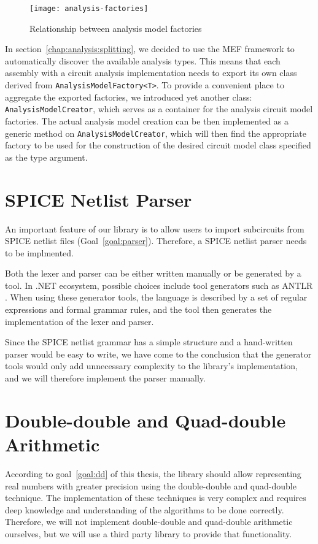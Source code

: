 \begin{figure}[h]
	\centering
	\texttt{[image: analysis-factories]}
	\caption{Relationship between analysis model factories}
	\label{fig:analysis-model-factories}
\end{figure}

In section~\ref{chap:analysis:splitting}, we decided to use the MEF framework to automatically discover the available analysis types. This means that each assembly with a circuit analysis implementation needs to export its own class derived from \texttt{AnalysisModel\+Factory<T>}. To provide a convenient place to aggregate the exported factories, we introduced yet another class: \texttt{AnalysisModelCreator}, which serves as a container for the analysis circuit model factories. The actual analysis model creation can be then implemented as a generic method on \texttt{AnalysisModelCreator}, which will then find the appropriate factory to be used for the construction of the desired circuit model class specified as the type argument.

\section{SPICE Netlist Parser}
\label{chap:analysis:parser}
An important feature of our library is to allow users to import subcircuits from SPICE netlist files (Goal~\ref{goal:parser}). Therefore, a SPICE netlist parser needs to be implmented.

Both the lexer and parser can be either written manually or be generated by a tool. In .NET ecosystem, possible choices include tool generators such as ANTLR \cite{antlr}. When using these generator tools, the language is described by a set of regular expressions and formal grammar rules, and the tool then generates the implementation of the lexer and parser.

Since the SPICE netlist grammar has a simple structure and a hand-written parser would be easy to write, we have come to the conclusion that the generator tools would only add unnecessary complexity to the library's implementation, and we will therefore implement the parser manually. 

\section[Double-double and Quad-double Arithmetic]{Double-double and Quad-double \\ Arithmetic}
\label{chap:analysis:dd}
According to goal~\ref{goal:dd} of this thesis, the library should allow representing real numbers with greater precision using the double-double and quad-double technique. The implementation of these techniques is very complex and requires deep knowledge and understanding of the algorithms to be done correctly. Therefore, we will not implement double-double and quad-double arithmetic ourselves, but we will use a third party library to provide that functionality.

